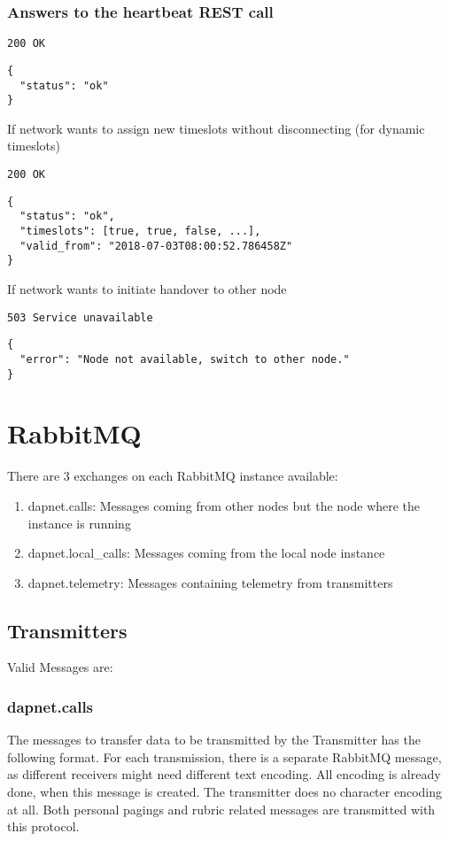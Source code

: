 \subsubsection{Answers to the heartbeat REST call}
\texttt{200 OK}
\begin{lstlisting}
{
  "status": "ok"
}
\end{lstlisting}

If network wants to assign new timeslots without disconnecting (for dynamic timeslots)

\texttt{200 OK}
\begin{lstlisting}
{
  "status": "ok",
  "timeslots": [true, true, false, ...],
  "valid_from": "2018-07-03T08:00:52.786458Z"
}
\end{lstlisting}

If network wants to initiate handover to other node

\texttt{503 Service unavailable}
\begin{lstlisting}
{
  "error": "Node not available, switch to other node."
}
\end{lstlisting}

\section{RabbitMQ}
\label{protocoldef:RabbitMQ}
There are 3 exchanges on each RabbitMQ instance available:
\begin{enumerate}
\item dapnet.calls: Messages coming from other nodes but the node where the instance is running
\item dapnet.local\_calls: Messages coming from the local node instance
\item dapnet.telemetry: Messages containing telemetry from transmitters
\end{enumerate}


\subsection{Transmitters}
\label{protocoldef:RabbitMQ:Transmitters}

Valid Messages are:

\subsubsection{dapnet.calls}
\label{protocoldef:RabbitMQ:dapnet.calls}
The messages to transfer data to be transmitted by the Transmitter has the following format.
For each transmission, there is a separate RabbitMQ message, as different receivers might need different text encoding. All encoding is already done, when this message is created. The transmitter does no character encoding at all. Both personal pagings and rubric related messages are transmitted with this protocol.

